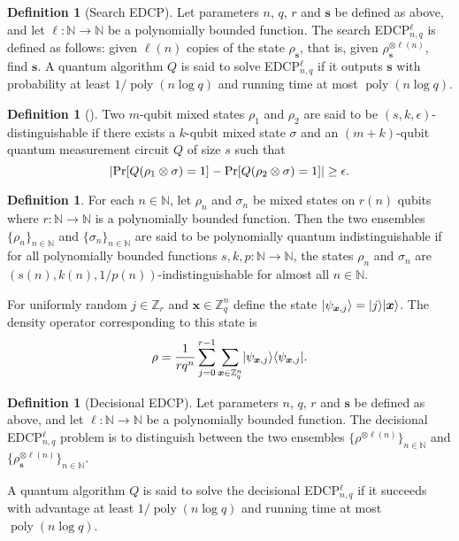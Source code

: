 \documentclass[11pt]{article}
\theoremstyle{plain}
\theoremstyle{definition}
\newtheorem{definition}[theorem]{Definition}
\DeclareMathOperator{\poly}{poly}
\DeclarePairedDelimiter{\abs}{\lvert}{\rvert}
\DeclarePairedDelimiter{\ldbrac}{\lvert}{\rangle}
\DeclarePairedDelimiter{\rdbrac}{\langle}{\rvert}
\def\N{\ensuremath{\mathbb{N}}}
\def\Z{\ensuremath{\mathbb{Z}}}
\begin{document}
\begin{definition}[Search EDCP]
    Let parameters $n$, $q$, $r$ and $\bm{s}$ be defined as above, and let $\ell: \N \rightarrow \N$ be a polynomially bounded function. The search EDCP$_{n, q}^\ell$ is defined as follows: given $\ell(n)$ copies of the state $\rho_{\bm{s}}$, that is, given $\rho_{\bm{s}}^{\otimes \ell(n)}$, find $\bm{s}$. A quantum algorithm $Q$ is said to solve EDCP$_{n, q}^\ell$ if it outputs $\bm{s}$ with probability at least $1 / \poly(n\log q)$ and running time at most $\poly(n\log q)$.
\end{definition}
\begin{definition}[\cite{watrous2009zero}]
    Two $m$-qubit mixed states $\rho_1$ and $\rho_2$ are said to be $(s, k, \epsilon)$-distinguishable if there exists a $k$-qubit mixed state $\sigma$ and an $(m + k)$-qubit quantum measurement circuit $Q$ of size $s$ such that
    \[ \abs{ \Pr[Q(\rho_1 \otimes \sigma) = 1] - \Pr[Q(\rho_2 \otimes \sigma) = 1] } \ge \epsilon. \]
\end{definition}
\begin{definition}
    For each $n \in \N$, let $\rho_n$ and $\sigma_n$ be mixed states on $r(n)$ qubits where $r: \N \rightarrow \N$ is a polynomially bounded function. Then the two ensembles $\{ \rho_n \}_{n \in \N}$ and $\{ \sigma_n \}_{n \in \N}$ are said to be polynomially quantum indistinguishable if for all polynomially bounded functions $s, k, p: \N \rightarrow \N$, the states $\rho_n$ and $\sigma_n$ are $(s(n), k(n), 1 / p(n))$-indistinguishable for almost all $n \in \N$.
\end{definition}
For uniformly random $j \in \Z_r$ and $\bm{x} \in \Z_q^n$ define the state $\ldbrac{\psi_{\bm{x}, j}} = \ldbrac{j}\ldbrac{\bm{x}}$. The density operator corresponding to this state is
\[ \rho = \frac{1}{rq^n} \sum_{j = 0}^{r - 1} \sum_{\bm{x} \in \Z_q^n} \ldbrac{\psi_{\bm{x}, j}} \rdbrac{\psi_{\bm{x}, j}}. \]
\begin{definition}[Decisional EDCP]
    Let parameters $n$, $q$, $r$ and $\bm{s}$ be defined as above, and let $\ell: \N \rightarrow \N$ be a polynomially bounded function. The decisional EDCP$_{n, q}^\ell$ problem is to distinguish between the two ensembles $\{ \rho^{\otimes \ell(n)} \}_{n \in \N}$ and $\{ \rho_{\bm{s}}^{\otimes \ell(n)} \}_{n \in \N}$.
\end{definition}
A quantum algorithm $Q$ is said to solve the decisional EDCP$_{n, q}^\ell$ if it succeeds with advantage at least $1 / \poly(n\log q)$ and running time at most $\poly(n\log q)$. 
\end{document}
